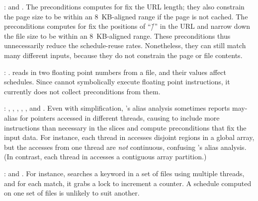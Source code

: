 : \apache and \aget. The
  preconditions \peregrine computes for \apache fix the URL length; they also
  constrain the page size to be within an 8~KB-aligned range if
    the page is not cached.  The preconditions \peregrine computes for \aget fix
    the positions of ``\v{/}'' in the URL and narrow down the file size
    to be within an 8~KB-aligned range.  These preconditions thus
      unnecessarily reduce the schedule-reuse rates.  Nonetheless, they
      can still match many different inputs, because they do not constrain
      the page or file contents.

: \barnes.  \barnes
  reads in two floating point numbers from a file, and their values affect
  schedules.  Since \peregrine cannot symbolically execute floating point
  instructions, it currently does not collect preconditions from them.

: \lun, \radix, \waters, \watern, \ocean,
  and \cholesky.  Even with simplification, \peregrine's alias analysis
  sometimes reports may-alias for pointers accessed in different threads,
  causing \peregrine to include more instructions than necessary in the
  slices and compute preconditions that fix the input data.  For
  instance, each thread in \lun accesses disjoint regions in a global
  array, but the accesses from one thread are \emph{not} continuous,
  confusing \peregrine's alias analysis.  (In contrast, each thread in \luc accesses
  a contiguous array partition.)

: \pfscan and
  \fmm.  For instance, \pfscan searches a keyword in a set of files using
  multiple threads, and for each match, it grabs a lock to increment a
  counter.  A schedule computed on one set of files is unlikely to suit
  another.

